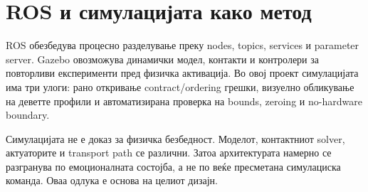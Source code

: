 \section{ROS и симулацијата како метод}

ROS обезбедува процесно разделување преку nodes, topics, services и parameter
server. Gazebo овозможува динамички модел,
контакти и контролери за повторливи експерименти пред физичка активација. Во
овој проект симулацијата има три
улоги: рано откривање contract/ordering грешки, визуелно обликување на деветте
профили и автоматизирана проверка на bounds, zeroing и no-hardware boundary.

Симулацијата не е доказ за физичка безбедност. Моделот, контактниот solver,
актуаторите и transport path се различни. Затоа архитектурата намерно се
разгранува по емоционалната состојба, а не по веќе пресметана симулациска
команда. Оваа одлука е основа на целиот дизајн.
